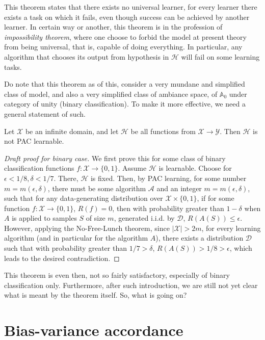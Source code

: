 This theorem states that there exists no universal learner, for every learner there exists a task on which it fails, even though success can be achieved by another learner. In certain way or another, this theorem is in the profession of \textit{impossibility theorem}, where one choose to forbid the model at present theory from being universal, that is, capable of doing everything. In particular, any algorithm that chooses its output from hypothesis in $\mathcal{H}$ will fail on some learning tasks. 

Do note that this theorem as of this, consider a very mundane and simplified class of model, and also a very simplified class of ambiance space, of $\mathbb{A}_{0}$ under category of unity (binary classification). To make it more effective, we need a general statement of such. 

\begin{col}
    Let $\mathcal{X}$ be an infinite domain, and let $\mathcal{H}$ be all functions from $\mathcal{X}\to \mathcal{Y}$. Then $\mathcal{H}$ is not PAC learnable. 
\end{col}

\begin{proof}[Draft proof for binary case]
    We first prove this for some class of binary classification functions $f: \mathcal{X}\to \{0,1\}$. Assume $\mathcal{H}$ is learnable. Choose for $\epsilon < 1/8, \delta < 1/7$. There, $\mathcal{H}$ is fixed. Then, by PAC learning, for some number $m=m(\epsilon, \delta)$, there must be some algorithm $\mathcal{A}$ and an integer $m = m(\epsilon, \delta)$, such that for any data-generating distribution over $\mathcal{X} \times \{0,1\}$, if for some function $f: \mathcal{X} \to \{0,1\}$, $R(f) = 0$, then with probability greater than $1 - \delta$ when $A$ is applied to samples $S$ of size $m$, generated i.i.d. by $\mathcal{D}$, $R(A(S)) \leq \epsilon$. However, applying the No-Free-Lunch theorem, since $|\mathcal{X}| > 2m$, for every learning algorithm (and in particular for the algorithm $A$), there exists a distribution $\mathcal{D}$ such that with probability greater than $1/7 > \delta$, $R(A(S)) > 1/8 > \epsilon$, which leads to the desired contradiction.
\end{proof}

This theorem is even then, not so fairly satisfactory, especially of binary classification only. Furthermore, after such introduction, we are still not yet clear what is meant by the theorem itself. So, what is going on?

\section{Bias-variance accordance}

